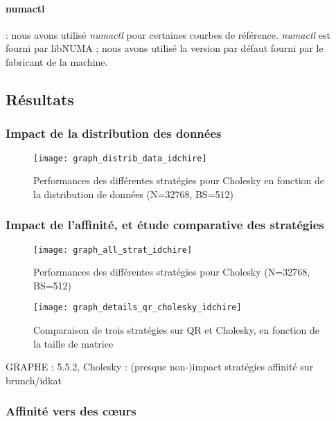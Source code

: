 \paragraph{numactl} : nous avons utilisé \emph{numactl} pour certaines courbes de référence. \emph{numactl} est fourni par libNUMA ; nous avons utilisé la version par défaut fourni par le fabricant de la machine.


\subsection{Résultats}\label{sec:contribs:perf_eval:resultats}

\subsubsection{Impact de la distribution des données}

\begin{figure}[ht]
  \centering
  \texttt{[image: graph\_distrib\_data\_idchire]}
  \caption{Performances des différentes stratégies pour Cholesky en fonction de la distribution de données (N=32768, BS=512)}\label{fig:contribs:perf_eval:distrib-idchire}
\end{figure}

\subsubsection{Impact de l'affinité, et étude comparative des stratégies}

\begin{figure}[ht]
  \centering
  \texttt{[image: graph\_all\_strat\_idchire]}
  \caption{Performances des différentes stratégies pour Cholesky (N=32768, BS=512)}\label{fig:contribs:perf_eval:eval-strategies}
\end{figure}

\begin{figure}[ht]
  \centering
  \texttt{[image: graph\_details\_qr\_cholesky\_idchire]}
  \caption{Comparaison de trois stratégies sur QR et Cholesky, en fonction de la taille de matrice}\label{fig:contribs:perf_eval:eval-qr-cholesky}
\end{figure}

\begin{todo}
GRAPHE : 5.5.2, Cholesky : (presque non-)impact stratégies affinité sur brunch/idkat
\end{todo}

\subsubsection{Affinité vers des cœurs}

